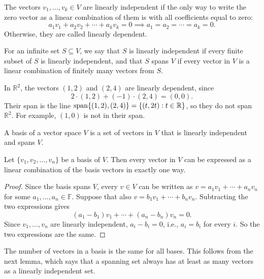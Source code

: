\begin{definition}
    The vectors $v_1, \ldots, v_k \in V$ are linearly independent if the only way to write the zero vector as a linear combination of them is with all coefficients equal to zero:
    \[a_1 v_1 + a_2 v_2 + \cdots + a_k v_k = 0 \implies a_1 = a_2 = \cdots = a_k = 0.\]
    Otherwise, they are called linearly dependent.

    For an infinite set $S \subseteq V$, we say that $S$ is linearly independent if every finite subset of $S$ is linearly independent, and that $S$ spans $V$ if every vector in $V$ is a linear combination of finitely many vectors from $S$.
\end{definition}

\begin{example}
    In $\mathbb{R}^2$, the vectors $(1, 2)$ and $(2, 4)$ are linearly dependent, since
    \[2 \cdot (1, 2) + (-1) \cdot (2, 4) = (0, 0).\]
    Their span is the line $\operatorname{span}\{(1, 2), (2, 4)\} = \{(t, 2t) : t \in \mathbb{R}\}$, so they do not span $\mathbb{R}^2$. For example, $(1, 0)$ is not in their span.
\end{example}

\begin{definition}[Basis]
    A basis of a vector space $V$ is a set of vectors in $V$ that is linearly independent and spans $V$.
\end{definition}

\begin{proposition}\label{L1-prop:unique-rep}
    Let $\{v_1, v_2, \ldots, v_n\}$ be a basis of $V$. Then every vector in $V$ can be expressed as a linear combination of the basis vectors in exactly one way.
\end{proposition}

\begin{proof}
    Since the basis spans $V$, every $v \in V$ can be written as $v = a_1 v_1 + \cdots + a_n v_n$ for some $a_1, \ldots, a_n \in \mathbb{F}$. Suppose that also $v = b_1 v_1 + \cdots + b_n v_n$. Subtracting the two expressions gives
    \[(a_1 - b_1) v_1 + \cdots + (a_n - b_n) v_n = 0.\]
    Since $v_1, \ldots, v_n$ are linearly independent, $a_i - b_i = 0$, i.e., $a_i = b_i$ for every $i$. So the two expressions are the same.
\end{proof}

The number of vectors in a basis is the same for all bases. This follows from the next lemma, which says that a spanning set always has at least as many vectors as a linearly independent set.

